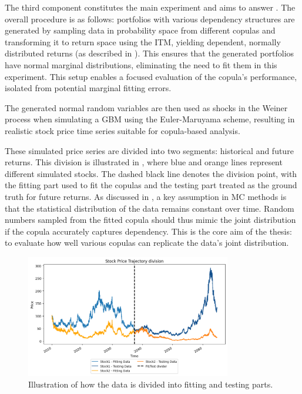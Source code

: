 The third component constitutes the main experiment and aims to answer \RQthree. The overall procedure is as follows: portfolios with various dependency structures are generated by sampling data in probability space from different copulas and transforming it to return space using the \gls{ITM}, yielding dependent, normally distributed returns (as described in ). This ensures that the generated portfolios have normal marginal distributions, eliminating the need to fit them in this experiment. This setup enables a focused evaluation of the copula's performance, isolated from potential marginal fitting errors.

The generated normal random variables are then used as shocks in the Weiner process when simulating a \gls{GBM} using the Euler-Maruyama scheme, resulting in realistic stock price time series suitable for copula-based analysis.

These simulated price series are divided into two segments: historical and future returns. This division is illustrated in , where blue and orange lines represent different simulated stocks. The dashed black line denotes the division point, with the fitting part used to fit the copulas and the testing part treated as the ground truth for future returns. As discussed in , a key assumption in \gls{MC} methods is that the statistical distribution of the data remains constant over time. Random numbers sampled from the fitted copula should thus mimic the joint distribution if the copula accurately captures dependency. This is the core aim of the thesis: to evaluate how well various copulas can replicate the data’s joint distribution.

\begin{figure}
\centering
\includegraphics[width=0.8\textwidth]{4Method/pictures/DataDivision.png}
\caption{Illustration of how the data is divided into fitting and testing parts.}
\label{fig:DataDivision}
\end{figure}

